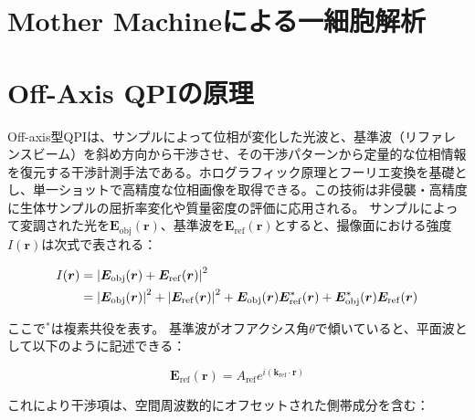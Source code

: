 \section{Mother Machineによる一細胞解析}
\section{}
\section{Off-Axis QPIの原理}
Off-axis型QPIは、サンプルによって位相が変化した光波と、基準波（リファレンスビーム）を斜め方向から干渉させ、その干渉パターンから定量的な位相情報を復元する干渉計測手法である。ホログラフィック原理とフーリエ変換を基礎とし、単一ショットで高精度な位相画像を取得できる。この技術は非侵襲・高精度に生体サンプルの屈折率変化や質量密度の評価に応用される。
サンプルによって変調された光を$\bm{E}_{\mathrm{obj}}(\bm{r})$、基準波を$\bm{E}_{\mathrm{ref}}(\bm{r})$とすると、撮像面における強度$I(\bm{r})$は次式で表される：

\begin{align}
I(\bm{r}) &= \abs{\bm{E}_{\mathrm{obj}}(\bm{r}) + \bm{E}_{\mathrm{ref}}(\bm{r})}^2 \\
&= \abs{\bm{E}_{\mathrm{obj}}(\bm{r})}^2 + \abs{\bm{E}_{\mathrm{ref}}(\bm{r})}^2 + \bm{E}_{\mathrm{obj}}(\bm{r}) \bm{E}_{\mathrm{ref}}^*(\bm{r}) + \bm{E}_{\mathrm{obj}}^*(\bm{r}) \bm{E}_{\mathrm{ref}}(\bm{r})
\end{align}

ここで$^*$は複素共役を表す。
基準波がオフアクシス角$\theta$で傾いていると、平面波として以下のように記述できる：

\begin{equation}
\bm{E}_{\mathrm{ref}}(\bm{r}) = A_{\mathrm{ref}} e^{i (\bm{k}_{\mathrm{ref}} \cdot \bm{r})}
\end{equation}

これにより干渉項は、空間周波数的にオフセットされた側帯成分を含む：


